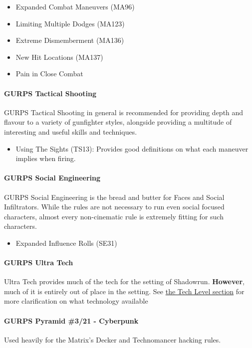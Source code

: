 \begin{multicols*}{3}
	\begin{itemize}
		\itemsep0em 
		\item Expanded Combat Maneuvers (MA96)
		\item Limiting Multiple Dodges (MA123)
		\item Extreme Dismemberment (MA136)
		\item New Hit Locations (MA137)
		\item Pain in Close Combat
	\end{itemize}
	
	\paragraph{GURPS Tactical Shooting}
	GURPS Tactical Shooting in general is recommended for providing depth and flavour to a variety of gunfighter styles, alongside providing a multitude of interesting and useful skills and techniques.
	\begin{itemize}
		\itemsep0em 
		\item Using The Sights (TS13): Provides good definitions on what each maneuver implies when firing.
	\end{itemize}
	
	\paragraph{GURPS Social Engineering}
	GURPS Social Engineering is the bread and butter for Faces and Social Infiltrators. While the rules are not necessary to run even social focused characters, almost every non-cinematic rule is extremely fitting for such characters.
	\begin{itemize}
		\itemsep0em 
		\item Expanded Influence Rolls (SE31)
	\end{itemize}
	
	\paragraph{GURPS Ultra Tech}
	Ultra Tech provides much of the tech for the setting of Shadowrun. \textbf{However}, much of it is entirely out of place in the setting. See \hyperref[TL]{the Tech Level section} for more clarification on what technology available
	
	\paragraph{GURPS Pyramid \#3/21 - Cyberpunk}
	Used heavily for the Matrix's Decker and Technomancer hacking rules.
	

\end{multicols*}
